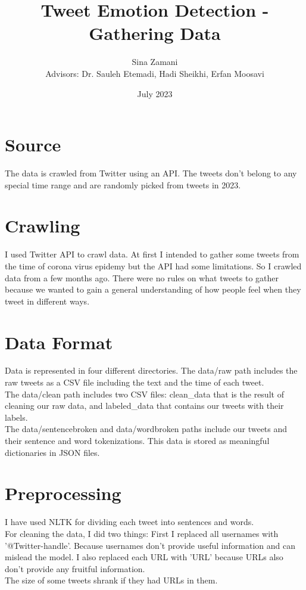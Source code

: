 \documentclass[rnd]{extarticle}
\begin{document}
  

	\title{Tweet Emotion Detection - Gathering Data}

	\author{Sina Zamani\\[0.2cm]{\small Advisors: Dr. Sauleh Etemadi, Hadi Sheikhi, Erfan Moosavi}}

	\date{July 2023}
	
	\maketitle

	\pagestyle{plain}
	
	
	\section{Source}
		The data is crawled from Twitter using an API. The tweets don't belong to any special time range and are randomly picked from tweets in 2023.
		
	\section{Crawling}
		I used Twitter API to crawl data. At first I intended to gather some tweets from the time of corona virus epidemy but the API had some limitations. So I crawled data from a few months ago. There were no rules on what tweets to gather because we wanted to gain a general understanding of how people feel when they tweet in different ways.
		
	\section{Data Format}
		Data is represented in four different directories. The data/raw path includes the raw tweets as a CSV file including the text and the time of each tweet.\\
		The data/clean path includes two CSV files: clean\_data that is the result of cleaning our raw data, and labeled\_data that contains our tweets with their labels.\\
		The data/sentencebroken and data/wordbroken paths include our tweets and their sentence and word tokenizations. This data is stored as meaningful dictionaries in JSON files.
		
	\section{Preprocessing}
		I have used NLTK for dividing each tweet into sentences and words.\\
		For cleaning the data, I did two things: First I replaced all usernames with '@Twitter-handle'. Because usernames don't provide useful information and can mislead the model. I also replaced each URL with 'URL' because URLs also don't provide any fruitful information.\\
		The size of some tweets shrank if they had URLs in them. 
		
\end{document}
